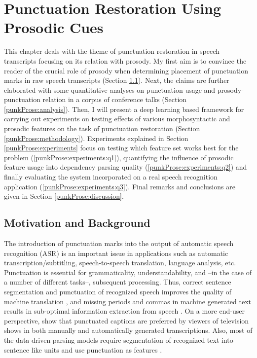 
\chapter{Punctuation Restoration Using Prosodic Cues}
\label{chapter:punkProse}

This chapter deals with the theme of punctuation restoration in speech transcripts focusing on its relation with prosody. My first aim is to convince the reader of the crucial role of prosody when determining placement of punctuation marks in raw speech transcripts (Section \ref{punkProse:motivation}). Next, the claims are further elaborated with some quantitative analyses on punctuation usage and prosody-punctuation relation in a corpus of conference talks (Section \ref{punkProse:analysis}). Then, I will present a deep learning based framework \citep{punkProse_slsp} for carrying out experiments on testing effects of various morphosyntactic and prosodic features on the task of punctuation restoration (Section \ref{punkProse:methodology}). Experiments explained in Section \ref{punkProse:experiments} focus on testing which feature set works best for the problem (\ref{punkProse:experiments:q1}), quantifying the influence of prosodic feature usage into dependency parsing quality (\ref{punkProse:experiments:q2}) and finally evaluating the system incorporated on a real speech recognition application (\ref{punkProse:experiments:q3}). Final remarks and conclusions are given in Section \ref{punkProse:discussion}. 

\section{Motivation and Background}
\label{punkProse:motivation}
The introduction of punctuation marks into the output of automatic speech recognition (ASR) is an important issue in applications such as automatic transcription/subtitling, speech-to-speech translation, language analysis, etc. Punctuation is essential for grammaticality, understandability, and --in the case of a number of different tasks--, subsequent processing. Thus, correct sentence segmentation and punctuation of recognized speech improves the quality of machine translation \citep{matusov2006automatic, peitz2011modeling, Cho2017NMTbasedSA, lu2010better}, and missing periods and commas in machine generated text results in sub-optimal information extraction from speech \citep{favre2008punctuating, hillard2006impact}. On a more end-user perspective, \cite{Tundik2018} show that punctuated captions are preferred by viewers of television shows in both manually and automatically generated transcriptions. Also, most of the data-driven parsing models require segmentation of recognized text into sentence like units and use punctuation as features \citep{Jones:1994:ERP:991886.991960, Spitkovsky_punctuation, MaPunc}. 


